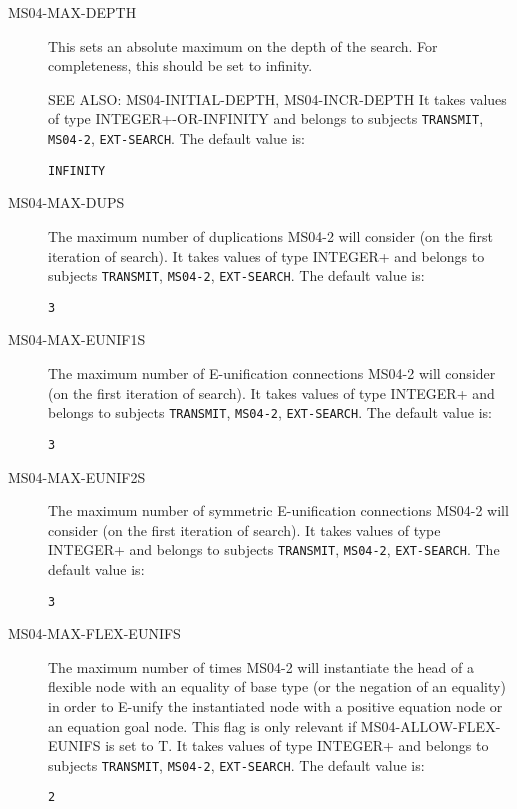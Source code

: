 \begin{description}
\item[MS04-MAX-DEPTH]  
This sets an absolute maximum on the depth of the search.
For completeness, this should be set to infinity.

SEE ALSO: MS04-INITIAL-DEPTH, MS04-INCR-DEPTH
It takes values of type INTEGER+-OR-INFINITY and belongs to subjects \texttt{TRANSMIT}, \texttt{MS04-2}, \texttt{EXT-SEARCH}.  The default value is: \begin{lstlisting}
INFINITY
\end{lstlisting}

\item[MS04-MAX-DUPS]  
The maximum number of duplications MS04-2 will consider
(on the first iteration of search).
It takes values of type INTEGER+ and belongs to subjects \texttt{TRANSMIT}, \texttt{MS04-2}, \texttt{EXT-SEARCH}.  The default value is: \begin{lstlisting}
3
\end{lstlisting}

\item[MS04-MAX-EUNIF1S]  
The maximum number of E-unification connections MS04-2 will consider
(on the first iteration of search).
It takes values of type INTEGER+ and belongs to subjects \texttt{TRANSMIT}, \texttt{MS04-2}, \texttt{EXT-SEARCH}.  The default value is: \begin{lstlisting}
3
\end{lstlisting}

\item[MS04-MAX-EUNIF2S]  
The maximum number of symmetric E-unification connections MS04-2 will consider
(on the first iteration of search).
It takes values of type INTEGER+ and belongs to subjects \texttt{TRANSMIT}, \texttt{MS04-2}, \texttt{EXT-SEARCH}.  The default value is: \begin{lstlisting}
3
\end{lstlisting}

\item[MS04-MAX-FLEX-EUNIFS]  
The maximum number of times MS04-2 will instantiate the head
of a flexible node with an equality of base type (or the negation of an equality)
in order to E-unify the instantiated node with a positive equation node or an equation goal node.
This flag is only relevant if MS04-ALLOW-FLEX-EUNIFS is set to T.
It takes values of type INTEGER+ and belongs to subjects \texttt{TRANSMIT}, \texttt{MS04-2}, \texttt{EXT-SEARCH}.  The default value is: \begin{lstlisting}
2
\end{lstlisting}


\end{description}
